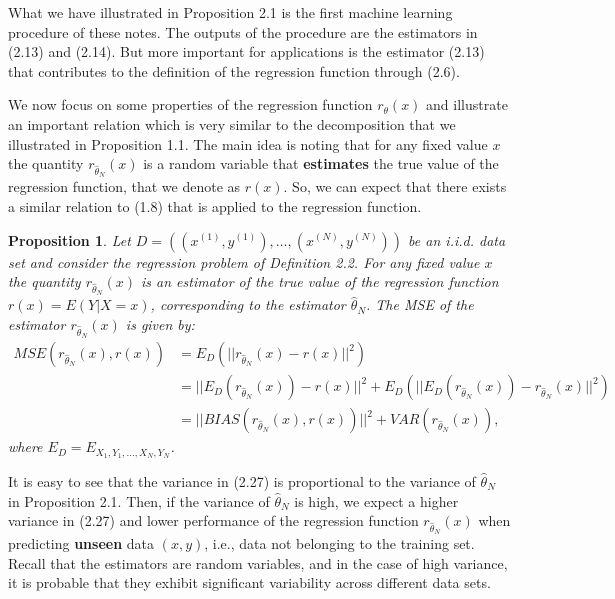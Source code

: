 \documentclass{report}
\newtheorem{proposition}{Proposition}[chapter]
\begin{document}
What we have illustrated in Proposition 2.1 is the first machine learning procedure of these notes. The outputs of the procedure are the estimators in (2.13) and (2.14). But more important for applications is the estimator (2.13) that contributes to the definition of the regression function through (2.6).

We now focus on some properties of the regression function $r_\theta(x)$ and illustrate an important relation which is very similar to the decomposition that we illustrated in Proposition 1.1. The main idea is noting that for any fixed value $x$ the quantity $r_{\hat{\theta}_N}(x)$ is a random variable that \textbf{estimates} the true value of the regression function, that we denote as $r(x)$. So, we can expect that there exists a similar relation to (1.8) that is applied to the regression function.

\begin{proposition}
Let $D = ((x^{(1)},y^{(1)}),\dots,(x^{(N)},y^{(N)}))$ be an i.i.d. data set and consider the regression problem of Definition 2.2. For any fixed value $x$ the quantity $r_{\hat{\theta}_N}(x)$ is an estimator of the true value of the regression function $r(x) = E(Y|X = x)$, corresponding to the estimator $\hat{\theta}_N$. The MSE of the estimator $r_{\hat{\theta}_N}(x)$ is given by:
\begin{equation}
\begin{split}
MSE(r_{\hat{\theta}_N}(x),r(x)) &= E_D(||r_{\hat{\theta}_N}(x) - r(x)||^2) \\
&=||E_D(r_{\hat{\theta}_N}(x)) - r(x)||^2+E_D(||E_D(r_{\hat{\theta}_N}(x)) - r_{\hat{\theta}_N}(x)||^2)\\
&=||BIAS(r_{\hat{\theta}_N}(x), r(x))||^2 + VAR(r_{\hat{\theta}_N}(x)),
\end{split}
\end{equation}
where $E_D = E_{X_1,Y_1,\dots,X_N,Y_N}$.
\end{proposition}
It is easy to see that the variance in (2.27) is proportional to the variance of $\hat{\theta}_N$ in Proposition 2.1. Then, if the variance of $\hat{\theta}_N$ is high, we expect a higher variance in (2.27) and lower performance of the regression function $r_{\hat{\theta}_N}(x)$ when predicting \textbf{unseen} data $(x,y)$, i.e., data not belonging to the training set. Recall that the estimators are random variables, and in the case of high variance, it is probable that they exhibit significant variability across different data sets.
\end{document}
